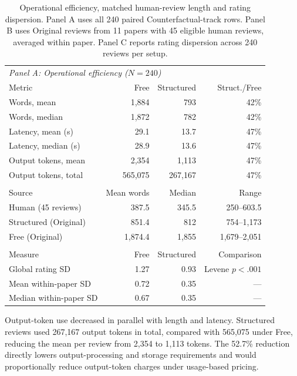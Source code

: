 \begin{table}[!t]
    \centering
    \caption{Operational efficiency, matched human-review length and rating dispersion. Panel A uses all 240 paired Counterfactual-track rows. Panel B uses Original reviews from 11 papers with 45 eligible human reviews, averaged within paper. Panel C reports rating dispersion across 240 reviews per setup.}
    \label{tab:rq4-tradeoffs}
    \small
    \setlength{\tabcolsep}{5pt}
    \begin{tabular}{lrrr}
        \toprule
        \multicolumn{4}{l}{\textit{Panel A: Operational efficiency ($N=240$)}} \\
        Metric & Free & Structured & Struct./Free \\
        \midrule
        Words, mean & 1,884 & 793 & 42\% \\
        Words, median & 1,872 & 782 & 42\% \\
        Latency, mean (s) & 29.1 & 13.7 & 47\% \\
        Latency, median (s) & 28.9 & 13.6 & 47\% \\
        Output tokens, mean & 2,354 & 1,113 & 47\% \\
        Output tokens, total & 565,075 & 267,167 & 47\% \\
        \addlinespace
        \multicolumn{4}{l}{\textit{Panel B: Matched review length (11 papers)}} \\
        Source & Mean words & Median & Range \\
        \midrule
        Human (45 reviews) & 387.5 & 345.5 & 250--603.5 \\
        Structured (Original) & 851.4 & 812 & 754--1,173 \\
        Free (Original) & 1,874.4 & 1,855 & 1,679--2,051 \\
        \addlinespace
        \multicolumn{4}{l}{\textit{Panel C: Rating dispersion ($N=240$)}} \\
        Measure & Free & Structured & Comparison \\
        \midrule
        Global rating SD & 1.27 & 0.93 & Levene $p<.001$ \\
        Mean within-paper SD & 0.72 & 0.35 & --- \\
        Median within-paper SD & 0.67 & 0.35 & --- \\
        \bottomrule
    \end{tabular}
\end{table}

Output-token use decreased in parallel with length and latency. Structured reviews used 267,167 output tokens in total, compared with 565,075 under Free, reducing the mean per review from 2,354 to 1,113 tokens. The 52.7\% reduction directly lowers output-processing and storage requirements and would proportionally reduce output-token charges under usage-based pricing.


